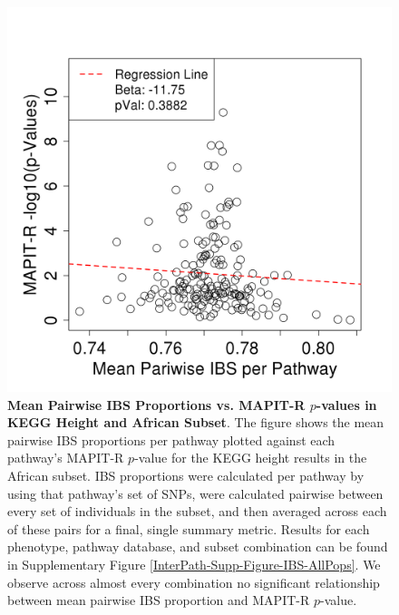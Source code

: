 \documentclass[12pt,a4paper]{article}
\begin{document}
\begin{figure}[htb]
\centering
\includegraphics[scale=.35]{Images/Main/InterPath_Main_Figure_IBS_vs2_AfrHght.png}
\caption[TBD]{\textbf{Mean Pairwise IBS Proportions vs. MAPIT-R $p$-values in KEGG Height and African Subset}. The figure shows the mean pairwise IBS proportions per pathway plotted against each pathway's MAPIT-R $p$-value for the KEGG height results in the African subset. IBS proportions were calculated per pathway by using that pathway's set of SNPs, were calculated pairwise between every set of individuals in the subset, and then averaged across each of these pairs for a final, single summary metric. Results for each phenotype, pathway database, and subset combination can be found in Supplementary Figure \ref{InterPath-Supp-Figure-IBS-AllPops}. We observe across almost every combination no significant relationship between mean pairwise IBS proportion and MAPIT-R $p$-value.}
\label{InterPath-Main-Figure-IBS-AfrHght}
\end{figure}
\end{document}

